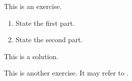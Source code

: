 \documentclass[12pt,a4paper]{article}
\begin{document}
\makesheetheader

\begin{exercise}\label{exercise:first}
This is an exercise.
\begin{enumerate}[label=(\alph*)]
  \item State the first part.
  \item State the second part.
\end{enumerate}
\end{exercise}

\begin{solution}
This is a solution.
\end{solution}

\begin{exercise}\label{exercise:second}
This is another exercise. It may refer to .
\end{exercise}

\printbibliography
\end{document}
